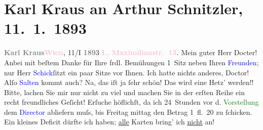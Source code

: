 

               \section[Karl Kraus an Arthur Schnitzler, 11. 1. 1893]{ Karl Kraus an Arthur Schnitzler, 11. 1. 1893}\nopagebreak{}\rehead{ }\normalsize\beginnumbering{} \toendnotes[C]{\smallbreak\pagebreak[2]} 
\toendnotes[C]{\smallbreak}\pstart
           \noindent{}{\pb}\textcolor{gray}{\textbf{Karl Kraus}}\hfill \textcolor{gray}{\textbf{\textcolor{pink}{Wien}{}\ledrightnote{\textcolor{pink}{Wien}},}}{ }11/I \textcolor{gray}{\textbf{189}}3\pend
           \pstart
           \raggedleft{}\textcolor{gray}{\textbf{\textcolor{pink}{I., Maximilianstr. 13}{}\ledrightnote{\textcolor{pink}{Mahlerstraße}}.}}\pend
           \pstart{}Mein guter Herr Docter!\pend\pstart
           Anbei mit beſtem Danke für Ihre frdl. Bemühungen 1 Sitz neben Ihren \textcolor{blue}{Freunden}{}; nur Herr
                        \textcolor{blue}{Schick}{}\ledrightnote{\textcolor{blue}{Friedrich Schik}}{ }ſitzt ein paar Sitze vor Ihnen. Ich hatte
                    nichts anderes, Doctor! Alſo \textcolor{blue}{Salten}{}\ledrightnote{\textcolor{blue}{Felix Salten}} kommt
                    auch? Na, das iſt ja ſehr schön! Das wird eine Hetz’ werden!! Bitte, lachen Sie
                    mir nur nicht zu viel und machen Sie in der erſten Reihe ein recht freundliches
                    Geſicht!\pend
           \pstart
           Erſuche höflichſt, da ich 24 Stunden vor d. \textcolor{green}{Vorstellung}{} dem \textcolor{blue}{Director}{} abliefern muſs, bis Freitag
                    mittag den Betrag 1 fl. 20 zu ſchicken. {\pb}Ein kleines Deficit dürfte
                    ich haben; \uline{alle} Karten bring’ ich \uline{nicht} an!\pend
